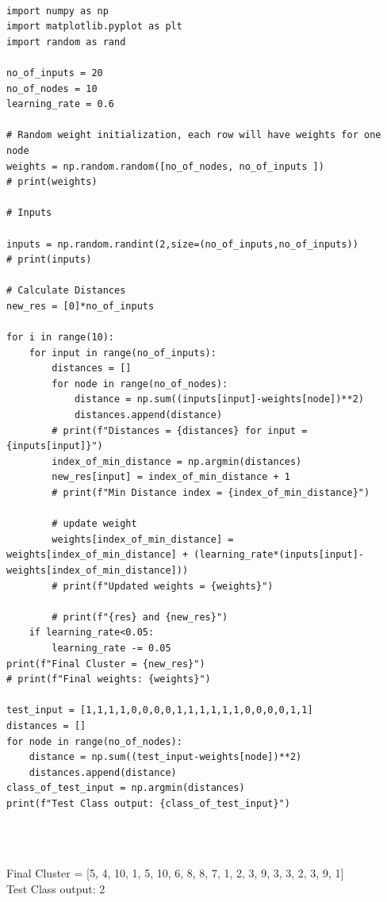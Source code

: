 \documentclass{article}
\begin{document}
    \begin{verbatim}

import numpy as np
import matplotlib.pyplot as plt
import random as rand

no_of_inputs = 20
no_of_nodes = 10
learning_rate = 0.6

# Random weight initialization, each row will have weights for one node
weights = np.random.random([no_of_nodes, no_of_inputs ])
# print(weights)

# Inputs

inputs = np.random.randint(2,size=(no_of_inputs,no_of_inputs))
# print(inputs)

# Calculate Distances
new_res = [0]*no_of_inputs

for i in range(10):
    for input in range(no_of_inputs):
        distances = []
        for node in range(no_of_nodes):
            distance = np.sum((inputs[input]-weights[node])**2)
            distances.append(distance)
        # print(f"Distances = {distances} for input = {inputs[input]}")
        index_of_min_distance = np.argmin(distances)
        new_res[input] = index_of_min_distance + 1
        # print(f"Min Distance index = {index_of_min_distance}")

        # update weight
        weights[index_of_min_distance] = weights[index_of_min_distance] + (learning_rate*(inputs[input]-weights[index_of_min_distance]))
        # print(f"Updated weights = {weights}")

        # print(f"{res} and {new_res}")
    if learning_rate<0.05:
        learning_rate -= 0.05
print(f"Final Cluster = {new_res}")
# print(f"Final weights: {weights}")

test_input = [1,1,1,1,0,0,0,0,1,1,1,1,1,1,0,0,0,0,1,1]
distances = []
for node in range(no_of_nodes):
    distance = np.sum((test_input-weights[node])**2)
    distances.append(distance)
class_of_test_input = np.argmin(distances)
print(f"Test Class output: {class_of_test_input}")

    
    \end{verbatim}

    \subsection{}
    \large{
    Final Cluster = [5, 4, 10, 1, 5, 10, 6, 8, 8, 7, 1, 2, 3, 9, 3, 3, 2, 3, 9, 1]\\
Test Class output: 2
}
    \vspace{0.5cm}
\end{document}
